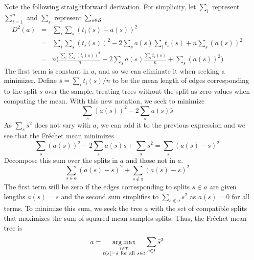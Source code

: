 \documentclass[12pt,letterpaper]{tufte-handout}
\DeclareMathOperator*{\argmax}{arg\,max}
\begin{document}
Note the following straightforward derivation.
For simplicity, let $\sum_i$ represent $\sum_{i=1}^n$ and $\sum_s$ represent $\sum_{s \in {\cal S}}$.
\begin{eqnarray*}
D^2(a) & = & \sum_i \sum_s (t_i(s) - a(s))^2 \\
& = & \sum_i \sum_s (t_i(s))^2 - 2  \sum_s a(s) \sum_i t_i(s) + n \sum_s (a(s))^2 \\
& = & n \Big( \frac{\sum_i \sum_s (t_i(s))^2}{n} - 2  \sum_s a(s) \frac{\sum_i t_i(s)}{n} + \sum_s (a(s))^2 \Big)
\end{eqnarray*}
The first term is constant in $a$,
and so we can eliminate it when seeking a minimizer.
Define $\bar{s} = \sum_i t_i(s)/n$ to be the mean length of edges corresponding to the split $s$ over the sample,
treating trees without the split as zero values when computing the mean.
With this new notation, we seek to minimize
$$
\sum_s (a(s))^2 - 2 \sum_s a(s) \bar{s}
$$
As $\sum_s \bar{s}^2$ does not vary with $a$,
we can add it to the previous expression and we see that the Fr\'{e}chet mean minimizes
$$
\sum_s (a(s))^2 - 2 \sum_s a(s) \bar{s} + \sum_s \bar{s}^2 = \sum_s (a(s) - \bar{s})^2
$$
Decompose this sum over the splits in $a$ and those not in $a$.
$$
\sum_{s \in a} (a(s) - \bar{s})^2 + \sum_{s \notin a} (a(s) - \bar{s})^2
$$
The first term will be zero if the edges corresponding to splits $s \in a$ are given lengths $a(s) = \bar{s}$
and the second sum simplifies to $\sum_{s \notin a} \bar{s}^2$
as $a(s) = 0$ for all terms.
To minimize this sum,
we seek the tree $a$ with the set of compatible splits that maximizes the sum of squared mean samples splits.
Thus, the Fr\'{e}chet mean tree is
$$
a = \argmax_{ \overset{t \in {\cal T}}{t(s) = \bar{s}\ \text{for all}\ s \in t}} \sum_{s \in t} \bar{s}^2
$$


\end{document}
